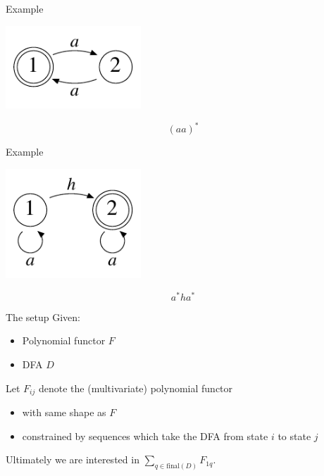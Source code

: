 \documentclass[xcolor=svgnames,12pt]{beamer}
\newenvironment{xframe}[1][]
  {\begin{frame}[fragile,environment=xframe,#1]}
  {\end{frame}}
\begin{document}
\begin{xframe}{Example}
  \begin{center}
    \includegraphics[width=2in]{even-DFA}

    \[ (aa)^* \]
  \end{center}
\end{xframe}

\begin{xframe}{Example}
  \begin{center}
    \includegraphics[width=2in]{deriv-DFA}

    \[ a^*ha^* \]
  \end{center}
\end{xframe}

\begin{xframe}{The setup}
  Given:
  \begin{itemize}
  \item Polynomial functor $F$
  \item DFA $D$
  \end{itemize} \medskip

  Let $F_{ij}$ denote the (multivariate) polynomial functor
  \begin{itemize}
    \item with same shape as $F$
    \item constrained by sequences which take the DFA from state $i$
      to state $j$
  \end{itemize} \medskip

  Ultimately we are interested in $\sum_{q \in \mathrm{final}(D)} F_{1q}$.
\end{xframe}

\end{document}
